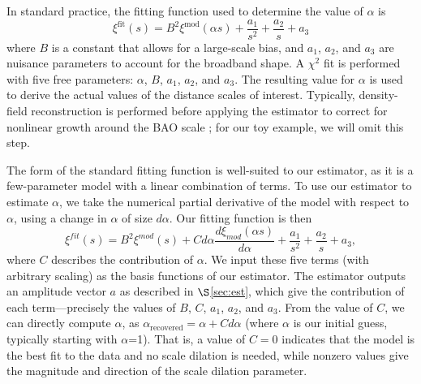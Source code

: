 \documentclass[modern]{aastex62}
\begin{document}

In standard practice, the fitting function used to determine the value of $\alpha$ is
\begin{equation}
\xi^{\text{fit}}(s) = B^2 \xi^{\text{mod}}(\alpha s) + \frac{a_1}{s^2} + \frac{a_2}{s} + a_3
\end{equation}
where $B$ is a constant that allows for a large-scale bias, and $a_1$, $a_2$, and $a_3$ are nuisance parameters to account for the broadband shape.
A $\chi^2$ fit is performed with five free parameters: $\alpha$, $B$, $a_1$, $a_2$, and $a_3$.
The resulting value for $\alpha$ is used to derive the actual values of the distance scales of interest.
Typically, density-field reconstruction is performed before applying the estimator to correct for nonlinear growth around the BAO scale \citep{Eisenstein2007}; for our toy example, we will omit this step.

The form of the standard fitting function is well-suited to our estimator, as it is a few-parameter model with a linear combination of terms.
To use our estimator to estimate $\alpha$, we take the numerical partial derivative of the model with respect to $\alpha$, using a change in $\alpha$ of size $d\alpha$.
Our fitting function is then
\begin{equation}
\xi^{fit}(s) = B^2 \xi^{mod}(s) + C d\alpha\frac{d\xi_{mod}(\alpha s)}{d\alpha} + \frac{a_1}{s^2} + \frac{a_2}{s} + a_3,
\end{equation}
where $C$ describes the contribution of $\alpha$.
We input these five terms (with arbitrary scaling) as the basis functions of our estimator.
The estimator outputs an amplitude vector $a$ as described in $\S$\ref{sec:est}, which give the contribution of each term---precisely the values of $B$, $C$, $a_1$, $a_2$, and $a_3$.
From the value of $C$, we can directly compute $\alpha$, as $\alpha_{\text{recovered}} =  \alpha + Cd\alpha$ (where $\alpha$ is our initial guess, typically starting with  $\alpha$=1). 
That is, a value of $C=0$ indicates that the model is the best fit to the data and no scale dilation is needed, while nonzero values give the magnitude and direction of the scale dilation parameter.
\end{document}
